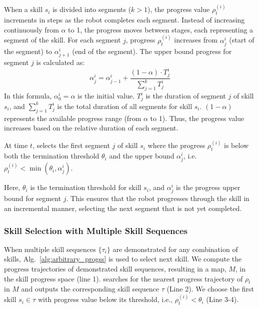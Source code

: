 When a skill \( s_i \) is divided into segments (\( k > 1 \)), the progress value \( \rho^{(i)}_t \) increments in steps as the robot completes each segment. Instead of increasing continuously from \( \alpha \) to 1, the progress moves between stages, each representing a segment of the skill. For each segment \( j \), progress \( \rho^{(i)}_t \) increases from \( \alpha^i_j \) (start of the segment) to \( \alpha^i_{j+1} \) (end of the segment). The upper bound progress for segment \( j \) is calculated as:
\[
\alpha^i_j = \alpha^i_{j-1} + \frac{(1 - \alpha) \cdot T_j^i}{\sum_{j=1}^k T_j^i}
\]
In this formula, \( \alpha^i_0 = \alpha \) is the initial value. \( T_j^i \) is the duration of segment \( j \) of skill \( s_i \), and \( \sum_{j=1}^k T_j^i \) is the total duration of all segments for skill \( s_i \). \( (1 - \alpha) \) represents the available progress range (from \( \alpha \) to 1). Thus, the progress value increases based on the relative duration of each segment.

At time \( t \), \progss selects the first segment \( j \) of skill \( s_i \) where the progress \( \rho^{(i)}_t \) is below both the termination threshold \( \theta_i \) and the upper bound \( \alpha^i_j \), i.e. 
\(
\rho^{(i)}_t < \min(\theta_i, \alpha^i_j)
\).

Here, \( \theta_i \) is the termination threshold for skill \( s_i \), and \( \alpha^i_j \) is the progress upper bound for segment \( j \). This ensures that the robot progresses through the skill in an incremental manner, selecting the next segment that is not yet completed.



\subsubsection{Skill Selection with Multiple Skill Sequences}
When multiple skill sequences $\{\tau_i\}$ are demonstrated for any combination of skills, Alg.~\ref{alg:arbitrary_progss} is used to select next skill.  
We compute the progress trajectories of demonstrated skill sequences, resulting in a map, $M$, in the skill progress space (line 1).   
\progss searches for the nearest progress trajectory of $\rho_t$ in $M$ and outputs the corresponding skill sequence $\tau$ (Line 2).
We choose the first skill $s_i\in \tau$ with progress value below its threshold, i.e., $\rho^{(i)}_t<\theta_i$ (Line 3-4).


